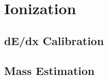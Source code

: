 
\section{Ionization}

\subsection{dE/dx Calibration}

\subsection{Mass Estimation}
\label{sec:mass_requirement}
